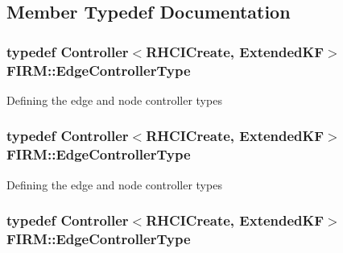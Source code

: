 \subsection{\-Member \-Typedef \-Documentation}
\hypertarget{class_f_i_r_m_a70abcb24fbc9f836b94119f65c8f8a37}{
\subsubsection[{\-Edge\-Controller\-Type}]{\setlength{\rightskip}{0pt plus 5cm}typedef {\bf \-Controller}$<${\bf \-R\-H\-C\-I\-Create}, {\bf \-Extended\-K\-F}$>$ {\bf \-F\-I\-R\-M\-::\-Edge\-Controller\-Type}}}\label{class_f_i_r_m_a70abcb24fbc9f836b94119f65c8f8a37}
\-Defining the edge and node controller types \hypertarget{class_f_i_r_m_a70abcb24fbc9f836b94119f65c8f8a37}{
\subsubsection[{\-Edge\-Controller\-Type}]{\setlength{\rightskip}{0pt plus 5cm}typedef {\bf \-Controller}$<${\bf \-R\-H\-C\-I\-Create}, {\bf \-Extended\-K\-F}$>$ {\bf \-F\-I\-R\-M\-::\-Edge\-Controller\-Type}}}\label{class_f_i_r_m_a70abcb24fbc9f836b94119f65c8f8a37}
\-Defining the edge and node controller types \hypertarget{class_f_i_r_m_a70abcb24fbc9f836b94119f65c8f8a37}{
\subsubsection[{\-Edge\-Controller\-Type}]{\setlength{\rightskip}{0pt plus 5cm}typedef {\bf \-Controller}$<${\bf \-R\-H\-C\-I\-Create}, {\bf \-Extended\-K\-F}$>$ {\bf \-F\-I\-R\-M\-::\-Edge\-Controller\-Type}}}\label{class_f_i_r_m_a70abcb24fbc9f836b94119f65c8f8a37}
